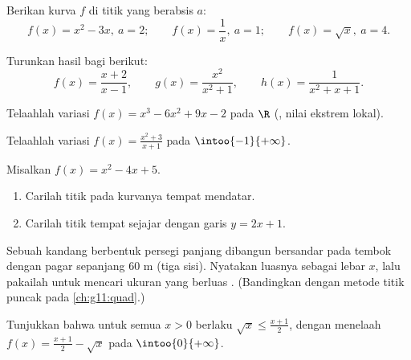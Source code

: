 \begin{exercise}[$\star$]\label{exo:g11:deriv:3}
Berikan   kurva $f$ di titik yang
berabsis $a$:
\[
f(x) = x^2 - 3x, \ a = 2; \qquad
f(x) = \frac1x, \ a = 1; \qquad
f(x) = \sqrt x, \ a = 4 .
\]
\end{exercise}

\begin{exercise}[$\star$]\label{exo:g11:deriv:4}
Turunkan hasil bagi berikut:
\[
f(x) = \frac{x+2}{x-1}, \qquad
g(x) = \frac{x^2}{x^2+1}, \qquad
h(x) = \frac{1}{x^2 + x + 1} .
\]
\end{exercise}

\begin{exercise}[$\star\star$]\label{exo:g11:deriv:5}
Telaahlah variasi $f(x) = x^3 - 6x^2 + 9x - 2$ pada $\R$ (, nilai ekstrem lokal).
\end{exercise}

\begin{exercise}[$\star\star$]\label{exo:g11:deriv:6}
Telaahlah variasi $f(x) = \frac{x^2 + 3}{x + 1}$ pada
$\intoo{-1}{+\infty}$.
\end{exercise}

\begin{exercise}[$\star\star$]\label{exo:g11:deriv:7}
Misalkan $f(x) = x^2 - 4x + 5$.
\begin{enumerate}
  \item Carilah titik pada kurvanya tempat  mendatar.
  \item Carilah titik tempat  sejajar dengan garis
        $y = 2x + 1$.
\end{enumerate}
\end{exercise}

\begin{exercise}[$\star\star$]\label{exo:g11:deriv:8}
Sebuah kandang berbentuk persegi panjang dibangun bersandar pada tembok dengan
pagar sepanjang $60$ m (tiga sisi). Nyatakan luasnya sebagai  lebar $x$,
lalu pakailah  untuk mencari ukuran yang berluas . (Bandingkan
dengan metode titik puncak pada \cref{ch:g11:quad}.)
\end{exercise}

\begin{exercise}[$\star\star$]\label{exo:g11:deriv:9}
Tunjukkan bahwa untuk semua $x > 0$ berlaku $\sqrt{x} \leq \frac{x + 1}{2}$,
dengan menelaah  $f(x) = \frac{x+1}{2} - \sqrt x$ pada $\intoo{0}{+\infty}$.
\end{exercise}

